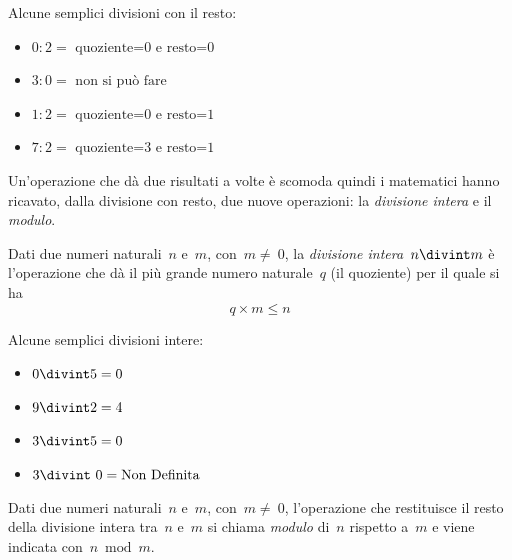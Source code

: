  \begin{esempio}
 Alcune semplici divisioni con il resto:
 \vspace{-1em}
\begin{multicols}{2}
\begin{itemize} [nosep]
\item \(0:2 = \text{ quoziente=0 e resto=0}\)
\item \(3:0 = \text{ non si può fare}\)
\item \(1:2 = \text{ quoziente=0 e resto=1}\)
\item \(7:2 = \text{ quoziente=3 e resto=1}\)
\end{itemize}
\end{multicols}
\end{esempio}

Un'operazione che dà due risultati a volte è scomoda quindi i matematici 
hanno ricavato, dalla divisione con resto, due nuove operazioni: 
la \emph{divisione intera} e il \emph{modulo}.

\begin{definizione}
 Dati due numeri naturali~\(n\) e~\(m\), con~\(m\neq~0\), la 
 \emph{divisione intera}~\(n\divint m\) è l'operazione che dà il più grande 
 numero naturale~\(q\) (il quoziente) per il quale si ha
\[q\times m\le n\]
\end{definizione}

 \begin{esempio}
 Alcune semplici divisioni intere:
 \vspace{-1em}
\begin{multicols}{2}
\begin{itemize} [nosep]
\item \(0 \divint 5=0\)
\item \(9 \divint 2=4\)
\item \(3\divint 5=0\)
\item \(3\divint~0=\text{Non Definita}\)
\end{itemize}
\end{multicols}
\end{esempio}

\begin{definizione}
 Dati due numeri naturali~\(n\) e~\(m\), con~\(m\neq~0\), l'operazione che 
 restituisce il resto della divisione intera tra~\(n\) e~\(m\) si chiama 
 \emph{modulo} di~\(n\) rispetto a~\(m\) e viene indicata con~\(n\bmod{m}\).
\end{definizione}

